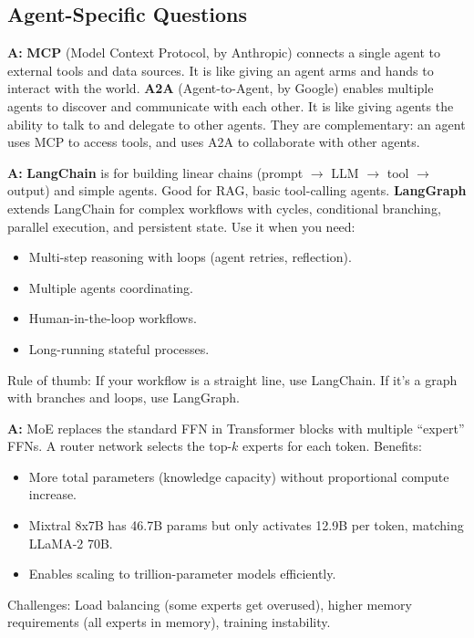 \documentclass[11pt,a4paper]{article}
\begin{document}
\subsection{Agent-Specific Questions}

\begin{warnbox}
\textbf{A:}
\textbf{MCP} (Model Context Protocol, by Anthropic) connects a single agent to external tools and data sources. It is like giving an agent arms and hands to interact with the world.
\textbf{A2A} (Agent-to-Agent, by Google) enables multiple agents to discover and communicate with each other. It is like giving agents the ability to talk to and delegate to other agents.
They are complementary: an agent uses MCP to access tools, and uses A2A to collaborate with other agents.
\end{warnbox}

\begin{warnbox}
\textbf{A:}
\textbf{LangChain} is for building linear chains (prompt $\to$ LLM $\to$ tool $\to$ output) and simple agents. Good for RAG, basic tool-calling agents.
\textbf{LangGraph} extends LangChain for complex workflows with cycles, conditional branching, parallel execution, and persistent state. Use it when you need:
\begin{itemize}[nosep]
  \item Multi-step reasoning with loops (agent retries, reflection).
  \item Multiple agents coordinating.
  \item Human-in-the-loop workflows.
  \item Long-running stateful processes.
\end{itemize}
Rule of thumb: If your workflow is a straight line, use LangChain. If it's a graph with branches and loops, use LangGraph.
\end{warnbox}

\begin{warnbox}
\textbf{A:}
MoE replaces the standard FFN in Transformer blocks with multiple ``expert'' FFNs. A router network selects the top-$k$ experts for each token. Benefits:
\begin{itemize}[nosep]
  \item More total parameters (knowledge capacity) without proportional compute increase.
  \item Mixtral 8x7B has 46.7B params but only activates 12.9B per token, matching LLaMA-2 70B.
  \item Enables scaling to trillion-parameter models efficiently.
\end{itemize}
Challenges: Load balancing (some experts get overused), higher memory requirements (all experts in memory), training instability.
\end{warnbox}
\end{document}
